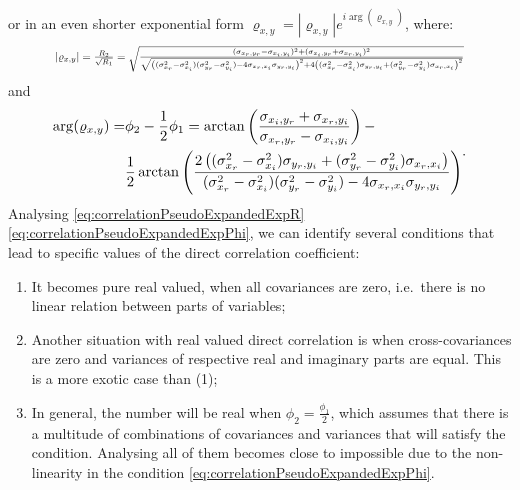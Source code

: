 \documentclass[
]{book}
\providecommand{\tightlist}{%
  \setlength{\itemsep}{0pt}\setlength{\parskip}{0pt}}
\begin{document}
or in an even shorter exponential form \({\varrho}_{x,y} = |{\varrho}_{x,y}| e ^{i \arg({\varrho}_{x,y})}\), where:
\begin{equation}
    \resizebox{0.85\textwidth}{!}{$
    |{\varrho}_{x,y}|= \frac{R_2}{\sqrt{R_1}} = \sqrt{\frac{(\sigma_{x_r, y_r} - \sigma_{x_i, y_i})^2 +  (\sigma_{x_i, y_r} + \sigma_{x_r, y_i})^2}{\sqrt{\left((\sigma_{x_r}^2 - \sigma_{x_i}^2)(\sigma_{y_r}^2 - \sigma_{y_i}^2) - 4 \sigma_{x_r,x_i} \sigma_{y_r,y_i} \right)^2+ 4 \left( (\sigma_{x_r}^2 - \sigma_{x_i}^2) \sigma_{y_r,y_i} + (\sigma_{y_r}^2 - \sigma_{y_i}^2) \sigma_{x_r,x_i} \right)^2}}}$}
    \label{eq:correlationPseudoExpandedExpR}
\end{equation}
and
\begin{equation}
    \resizebox{0.85\textwidth}{!}{$
    \begin{aligned}
    \arg({\varrho}_{x,y}) = & \phi_2 - \frac{1}{2} \phi_1 = \arctan \left( \frac{\sigma_{x_i, y_r} + \sigma_{x_r, y_i}}{\sigma_{x_r, y_r} - \sigma_{x_i, y_i}} \right) - \\
    & \frac{1}{2}\arctan \left(\frac{2 \left( (\sigma_{x_r}^2 - \sigma_{x_i}^2) \sigma_{y_r,y_i} + (\sigma_{y_r}^2 - \sigma_{y_i}^2) \sigma_{x_r,x_i} \right)}{(\sigma_{x_r}^2 - \sigma_{x_i}^2)(\sigma_{y_r}^2 - \sigma_{y_i}^2) - 4 \sigma_{x_r,x_i} \sigma_{y_r,y_i}}\right)
    \end{aligned}$}.
    \label{eq:correlationPseudoExpandedExpPhi}
\end{equation}
Analysing \eqref{eq:correlationPseudoExpandedExpR} \eqref{eq:correlationPseudoExpandedExpPhi}, we can identify several conditions that lead to specific values of the direct correlation coefficient:

\begin{enumerate}
\def\labelenumi{\arabic{enumi}.}
\tightlist
\item
  It becomes pure real valued, when all covariances are zero, i.e.~there is no linear relation between parts of variables;
\item
  Another situation with real valued direct correlation is when cross-covariances are zero and variances of respective real and imaginary parts are equal. This is a more exotic case than (1);
\item
  In general, the number will be real when \(\phi_2 = \frac{\phi_1}{2}\), which assumes that there is a multitude of combinations of covariances and variances that will satisfy the condition. Analysing all of them becomes close to impossible due to the non-linearity in the condition \eqref{eq:correlationPseudoExpandedExpPhi}.
\end{enumerate}
\end{document}
